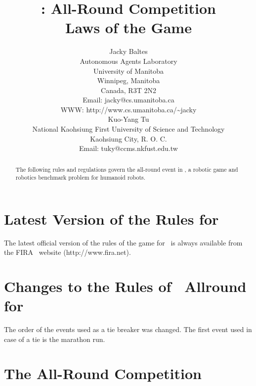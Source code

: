\documentclass[12pt]{hurocup}
\begin{document}


\title{\HuroCup: All-Round Competition\\
  Laws of the Game \thisyear}


\author{Jacky Baltes\\
Autonomous Agents Laboratory\\
University of Manitoba\\
Winnipeg, Manitoba\\
Canada, R3T 2N2\\
Email: jacky@cs.umanitoba.ca\\
WWW: http://www.cs.umanitoba.ca/\~{ }jacky\\[5mm]
Kuo-Yang Tu\\
National Kaohsiung First University of Science and Technology\\
Kaohsiung City, R. O. C.\\
Email: tuky@ccms.nkfust.edu.tw\\
}

\maketitle
\begin{abstract}
The following rules and regulations govern the all-round event in
\HuroCup, a robotic game and robotics benchmark problem for humanoid
robots.
%
\end{abstract}

\section*{Latest Version of the Rules for \HuroCup}
\label{sec:updates}

The latest official version of the rules of the game for \HuroCup\ is
always available from the FIRA \HuroCup\ website (http://www.fira.net).

\section*{Changes to the Rules of \HuroCup\ Allround for \thisyear}

The order of the events used as a tie breaker was changed. The first
event used in case of a tie is the marathon run.

\newpage

\section{The All-Round Competition}
\label{sec:all-round} 
\end{document}
